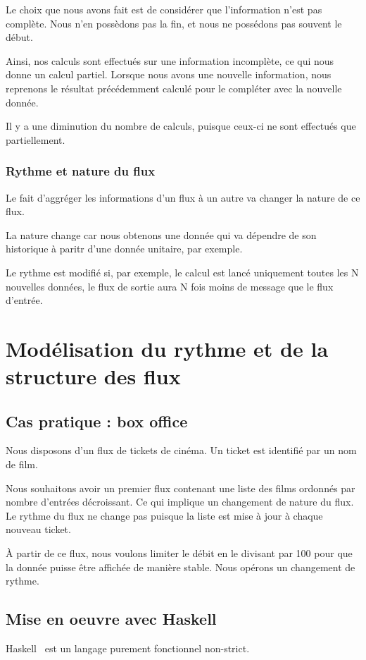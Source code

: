 \documentclass{llncs}
\begin{document}
Le choix que nous avons fait est de considérer que l'information n'est pas complète.
Nous n'en possèdons pas la fin, et nous ne possédons pas souvent le début.

Ainsi, nos calculs sont effectués sur une information incomplète, ce qui nous
donne un calcul partiel.
Lorsque nous avons une nouvelle information, nous reprenons le résultat
précédemment calculé pour le compléter avec la nouvelle donnée.

Il y a une diminution du nombre de calculs, puisque ceux-ci ne sont effectués
que partiellement.

\subsubsection{Rythme et nature du flux}
Le fait d'aggréger les informations d'un flux à un autre va changer la nature
de ce flux.

La nature change car nous obtenons une donnée qui va dépendre de son historique
à paritr d'une donnée unitaire, par exemple.

Le rythme est modifié si, par exemple, le calcul est lancé uniquement toutes les
N nouvelles données, le flux de sortie aura N fois moins de message que le flux d'entrée.

\section{Modélisation du rythme et de la structure des flux}
\subsection{Cas pratique : box office}
Nous disposons d'un flux de tickets de cinéma.
Un ticket est identifié par un nom de film.

Nous souhaitons avoir un premier flux contenant une liste des films ordonnés par
nombre d'entrées décroissant.
Ce qui implique un changement de nature du flux.
Le rythme du flux ne change pas puisque la liste est mise à jour à chaque nouveau
ticket.

À partir de ce flux, nous voulons limiter le débit en le divisant par 100 pour
que la donnée puisse être affichée de manière stable.
Nous opérons un changement de rythme.

\subsection{Mise en oeuvre avec Haskell}
Haskell~\cite{Haskell10} est un langage purement fonctionnel non-strict.
\end{document}

